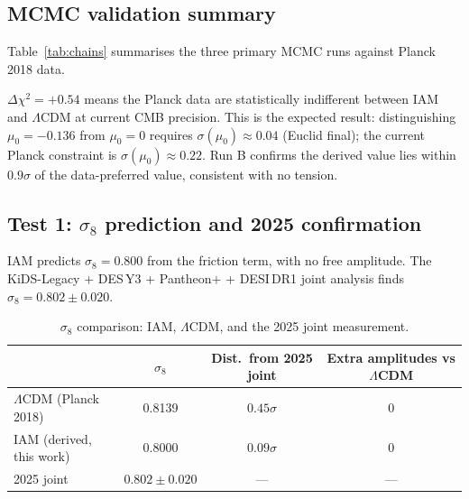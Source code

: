 \documentclass[12pt,a4paper]{article}
\begin{document}
\subsection{MCMC validation summary}

Table~\ref{tab:chains} summarises the three primary MCMC runs against Planck 2018 data.

\begin{table}[h]
\centering
\small
\caption{Three-run MCMC comparison against Planck 2018.
$\Delta\chi^2$ is computed on a matched likelihood set (apples-to-apples).}
\label{tab:chains}
\end{table}

$\Delta\chi^2 = +0.54$ means the Planck data are statistically indifferent between
IAM and $\Lambda$CDM at current CMB precision. This is the expected result:
distinguishing $\mu_0 = -0.136$ from $\mu_0 = 0$ requires
$\sigma(\mu_0) \approx 0.04$ (Euclid final); the current Planck constraint is
$\sigma(\mu_0) \approx 0.22$. Run B confirms the derived value lies within
$0.9\sigma$ of the data-preferred value, consistent with no tension.

\subsection{Test 1: $\sigma_8$ prediction and 2025 confirmation}

IAM predicts $\sigma_8 = 0.800$ from the friction term, with no free amplitude.
The KiDS-Legacy + DES\,Y3 + Pantheon$+$ + DESI\,DR1 joint analysis
\citep{Stolzner2025} finds $\sigma_8 = 0.802 \pm 0.020$.

\begin{table}[h]
\centering
\small
\caption{$\sigma_8$ comparison: IAM, $\Lambda$CDM, and the 2025 joint measurement.}
\label{tab:sigma8}
\begin{tabular}{lccc}
\toprule
& $\sigma_8$ & Dist.\ from 2025 joint & Extra amplitudes vs $\Lambda$CDM \\
\midrule
$\Lambda$CDM (Planck 2018) & 0.8139 & $0.45\sigma$ & 0 \\
IAM (derived, this work) & 0.8000 & $0.09\sigma$ & 0 \\
2025 joint \citep{Stolzner2025} & $0.802 \pm 0.020$ & --- & --- \\
\bottomrule
\end{tabular}
\end{table}
\end{document}
